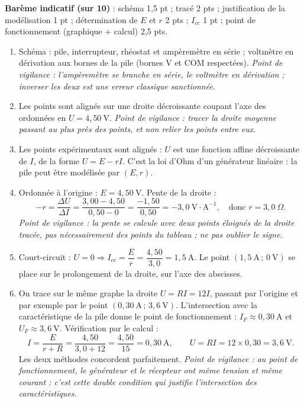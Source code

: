 \documentclass[11pt]{article}
\begin{document}
\begin{corrige}
\textbf{Barème indicatif (sur 10)} : schéma 1,5 pt ; tracé 2 pts ; justification de la modélisation 1 pt ; détermination de $E$ et $r$ 2 pts ; $I_{cc}$ 1 pt ; point de fonctionnement (graphique + calcul) 2,5 pts.
\begin{enumerate}
\item Schéma : pile, interrupteur, rhéostat et ampèremètre en série ; voltmètre en dérivation aux bornes de la pile (bornes V et COM respectées). \emph{Point de vigilance : l'ampèremètre se branche en série, le voltmètre en dérivation ; inverser les deux est une erreur classique sanctionnée.}
\item Les points sont alignés sur une droite décroissante coupant l'axe des ordonnées en $U = 4,50~\text{V}$. \emph{Point de vigilance : tracer la droite moyenne passant au plus près des points, et non relier les points entre eux.}
\item Les points expérimentaux sont alignés : $U$ est une fonction affine décroissante de $I$, de la forme $U = E - rI$. C'est la loi d'Ohm d'un générateur linéaire : la pile peut être modélisée par $(E, r)$.
\item Ordonnée à l'origine : $E = 4,50~\text{V}$. Pente de la droite :
\[ -r = \dfrac{\Delta U}{\Delta I} = \dfrac{3,00 - 4,50}{0,50 - 0} = \dfrac{-1,50}{0,50} = -3,0~\text{V}\cdot\text{A}^{-1}, \quad \text{donc } r = 3,0~\Omega. \]
\emph{Point de vigilance : la pente se calcule avec deux points éloignés de la droite tracée, pas nécessairement des points du tableau ; ne pas oublier le signe.}
\item Court-circuit : $U = 0 \Rightarrow I_{cc} = \dfrac{E}{r} = \dfrac{4,50}{3,0} = 1,5~\text{A}$. Le point $(1,5~\text{A} \,;\, 0~\text{V})$ se place sur le prolongement de la droite, sur l'axe des abscisses.
\item On trace sur le même graphe la droite $U = RI = 12I$, passant par l'origine et par exemple par le point $(0,30~\text{A} \,;\, 3,6~\text{V})$. L'intersection avec la caractéristique de la pile donne le point de fonctionnement : $I_F \approx 0,30~\text{A}$ et $U_F \approx 3,6~\text{V}$. Vérification par le calcul :
\[ I = \dfrac{E}{r + R} = \dfrac{4,50}{3,0 + 12} = \dfrac{4,50}{15} = 0,30~\text{A}, \qquad U = RI = 12 \times 0,30 = 3,6~\text{V}. \]
Les deux méthodes concordent parfaitement. \emph{Point de vigilance : au point de fonctionnement, le générateur et le récepteur ont même tension et même courant : c'est cette double condition qui justifie l'intersection des caractéristiques.}
\end{enumerate}
\end{corrige}
\end{document}
